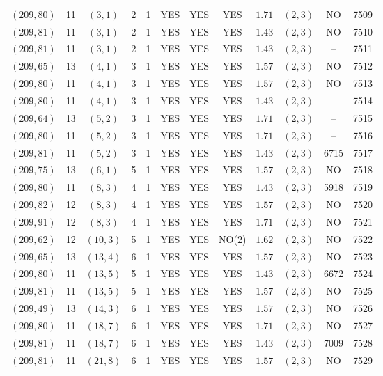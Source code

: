 \begin{longtable}{|c|c|c|c|c|c|c|c|c|c|c|c|}
$(209,80)$ & 11 & $(3,1)$ & 2 & 1 & YES & YES & YES & $1.71$ & $(2,3)$ & NO & 7509\\
$(209,81)$ & 11 & $(3,1)$ & 2 & 1 & YES & YES & YES & $1.43$ & $(2,3)$ & NO & 7510\\
$(209,81)$ & 11 & $(3,1)$ & 2 & 1 & YES & YES & YES & $1.43$ & $(2,3)$ & -- & 7511\\
$(209,65)$ & 13 & $(4,1)$ & 3 & 1 & YES & YES & YES & $1.57$ & $(2,3)$ & NO & 7512\\
$(209,80)$ & 11 & $(4,1)$ & 3 & 1 & YES & YES & YES & $1.57$ & $(2,3)$ & NO & 7513\\
$(209,80)$ & 11 & $(4,1)$ & 3 & 1 & YES & YES & YES & $1.43$ & $(2,3)$ & -- & 7514\\
$(209,64)$ & 13 & $(5,2)$ & 3 & 1 & YES & YES & YES & $1.71$ & $(2,3)$ & -- & 7515\\
$(209,80)$ & 11 & $(5,2)$ & 3 & 1 & YES & YES & YES & $1.71$ & $(2,3)$ & -- & 7516\\
$(209,81)$ & 11 & $(5,2)$ & 3 & 1 & YES & YES & YES & $1.43$ & $(2,3)$ & 6715 & 7517\\
$(209,75)$ & 13 & $(6,1)$ & 5 & 1 & YES & YES & YES & $1.57$ & $(2,3)$ & NO & 7518\\
$(209,80)$ & 11 & $(8,3)$ & 4 & 1 & YES & YES & YES & $1.43$ & $(2,3)$ & 5918 & 7519\\
$(209,82)$ & 12 & $(8,3)$ & 4 & 1 & YES & YES & YES & $1.57$ & $(2,3)$ & NO & 7520\\
$(209,91)$ & 12 & $(8,3)$ & 4 & 1 & YES & YES & YES & $1.71$ & $(2,3)$ & NO & 7521\\
$(209,62)$ & 12 & $(10,3)$ & 5 & 1 & YES & YES & NO(2) & $1.62$ & $(2,3)$ & NO & 7522\\
$(209,65)$ & 13 & $(13,4)$ & 6 & 1 & YES & YES & YES & $1.57$ & $(2,3)$ & NO & 7523\\
$(209,80)$ & 11 & $(13,5)$ & 5 & 1 & YES & YES & YES & $1.43$ & $(2,3)$ & 6672 & 7524\\
$(209,81)$ & 11 & $(13,5)$ & 5 & 1 & YES & YES & YES & $1.57$ & $(2,3)$ & NO & 7525\\
$(209,49)$ & 13 & $(14,3)$ & 6 & 1 & YES & YES & YES & $1.57$ & $(2,3)$ & NO & 7526\\
$(209,80)$ & 11 & $(18,7)$ & 6 & 1 & YES & YES & YES & $1.71$ & $(2,3)$ & NO & 7527\\
$(209,81)$ & 11 & $(18,7)$ & 6 & 1 & YES & YES & YES & $1.43$ & $(2,3)$ & 7009 & 7528\\
$(209,81)$ & 11 & $(21,8)$ & 6 & 1 & YES & YES & YES & $1.57$ & $(2,3)$ & NO & 7529\\

\end{longtable}
